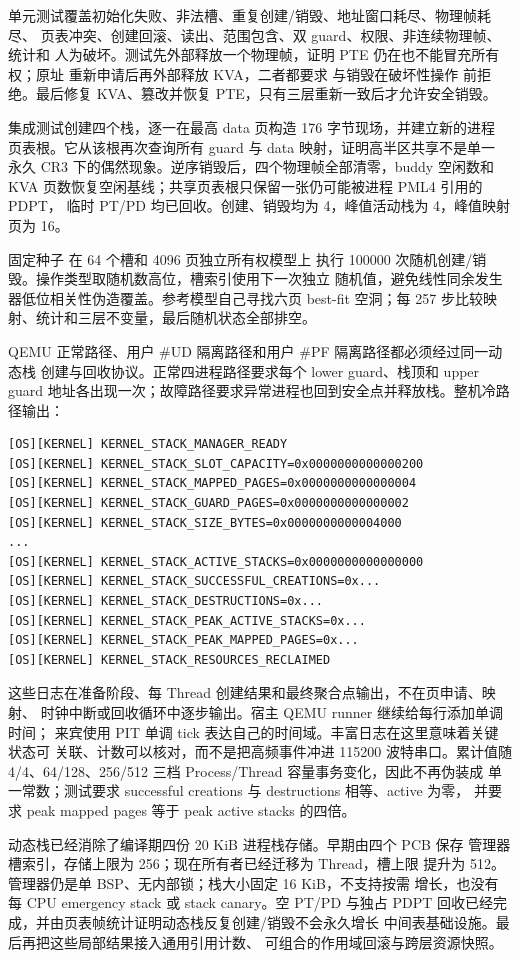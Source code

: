 单元测试覆盖初始化失败、非法槽、重复创建/销毁、地址窗口耗尽、物理帧耗尽、
页表冲突、创建回滚、读出、范围包含、双 guard、权限、非连续物理帧、统计和
人为破坏。测试先外部释放一个物理帧，证明 PTE 仍在也不能冒充所有权；原址
重新申请后再外部释放 KVA，二者都要求  与销毁在破坏性操作
前拒绝。最后修复 KVA、篡改并恢复 PTE，只有三层重新一致后才允许安全销毁。

集成测试创建四个栈，逐一在最高 data 页构造 176 字节现场，并建立新的进程
页表根。它从该根再次查询所有 guard 与 data 映射，证明高半区共享不是单一
永久 CR3 下的偶然现象。逆序销毁后，四个物理帧全部清零，buddy 空闲数和
KVA 页数恢复空闲基线；共享页表根只保留一张仍可能被进程 PML4 引用的 PDPT，
临时 PT/PD 均已回收。创建、销毁均为 4，峰值活动栈为 4，峰值映射页为 16。

固定种子  在 64 个槽和 4096 页独立所有权模型上
执行 100000 次随机创建/销毁。操作类型取随机数高位，槽索引使用下一次独立
随机值，避免线性同余发生器低位相关性伪造覆盖。参考模型自己寻找六页
best-fit 空洞；每 257 步比较映射、统计和三层不变量，最后随机状态全部排空。

QEMU 正常路径、用户 \#UD 隔离路径和用户 \#PF 隔离路径都必须经过同一动态栈
创建与回收协议。正常四进程路径要求每个 lower guard、栈顶和 upper guard
地址各出现一次；故障路径要求异常进程也回到安全点并释放栈。整机冷路径输出：

\begin{verbatim}
[OS][KERNEL] KERNEL_STACK_MANAGER_READY
[OS][KERNEL] KERNEL_STACK_SLOT_CAPACITY=0x0000000000000200
[OS][KERNEL] KERNEL_STACK_MAPPED_PAGES=0x0000000000000004
[OS][KERNEL] KERNEL_STACK_GUARD_PAGES=0x0000000000000002
[OS][KERNEL] KERNEL_STACK_SIZE_BYTES=0x0000000000004000
...
[OS][KERNEL] KERNEL_STACK_ACTIVE_STACKS=0x0000000000000000
[OS][KERNEL] KERNEL_STACK_SUCCESSFUL_CREATIONS=0x...
[OS][KERNEL] KERNEL_STACK_DESTRUCTIONS=0x...
[OS][KERNEL] KERNEL_STACK_PEAK_ACTIVE_STACKS=0x...
[OS][KERNEL] KERNEL_STACK_PEAK_MAPPED_PAGES=0x...
[OS][KERNEL] KERNEL_STACK_RESOURCES_RECLAIMED
\end{verbatim}

这些日志在准备阶段、每 Thread 创建结果和最终聚合点输出，不在页申请、映射、
时钟中断或回收循环中逐步输出。宿主 QEMU runner 继续给每行添加单调时间；
来宾使用 PIT 单调 tick 表达自己的时间域。丰富日志在这里意味着关键状态可
关联、计数可以核对，而不是把高频事件冲进 115200 波特串口。累计值随
4/4、64/128、256/512 三档 Process/Thread 容量事务变化，因此不再伪装成
单一常数；测试要求 successful creations 与 destructions 相等、active 为零，
并要求 peak mapped pages 等于 peak active stacks 的四倍。

动态栈已经消除了编译期四份 20 KiB 进程栈存储。早期由四个 PCB 保存
管理器槽索引，存储上限为 256；现在所有者已经迁移为 Thread，槽上限
提升为 512。管理器仍是单 BSP、无内部锁；栈大小固定 16 KiB，不支持按需
增长，也没有每 CPU emergency stack 或 stack canary。空 PT/PD 与独占
PDPT 回收已经完成，并由页表帧统计证明动态栈反复创建/销毁不会永久增长
中间表基础设施。最后再把这些局部结果接入通用引用计数、
可组合的作用域回滚与跨层资源快照。
